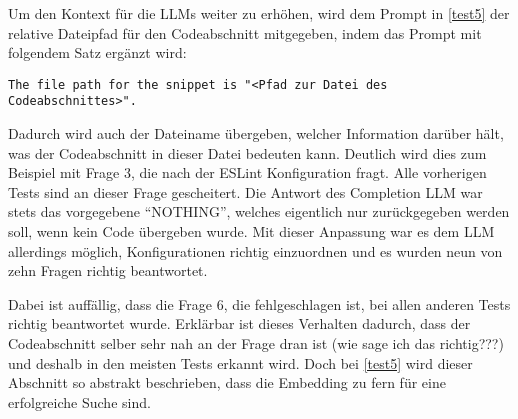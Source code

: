 \documentclass[../main.tex]{subfiles}
\begin{document}
Um den Kontext für die \glspl{LLM} weiter zu erhöhen, wird dem Prompt in \ref{test5} der relative Dateipfad für den Codeabschnitt mitgegeben, indem das Prompt mit folgendem Satz ergänzt wird:
\begin{center}
\begin{lstlisting}
The file path for the snippet is "<Pfad zur Datei des Codeabschnittes>".
\end{lstlisting}
\end{center}
Dadurch wird auch der Dateiname übergeben, welcher Information darüber hält, was der Codeabschnitt in dieser Datei bedeuten kann.
Deutlich wird dies zum Beispiel mit Frage 3, die nach der ESLint Konfiguration fragt.
Alle vorherigen Tests sind an dieser Frage gescheitert.
Die Antwort des Completion \gls{LLM} war stets das vorgegebene \enquote{NOTHING}, welches eigentlich nur zurückgegeben werden soll, wenn kein Code übergeben wurde.
Mit dieser Anpassung war es dem \gls{LLM} allerdings möglich, Konfigurationen richtig einzuordnen und es wurden neun von zehn Fragen richtig beantwortet.

Dabei ist auffällig, dass die Frage 6, die fehlgeschlagen ist, bei allen anderen Tests richtig beantwortet wurde.
Erklärbar ist dieses Verhalten dadurch, dass der Codeabschnitt selber sehr nah an der Frage dran ist (wie sage ich das richtig???) und deshalb in den meisten Tests erkannt wird.
Doch bei \ref{test5} wird dieser Abschnitt so abstrakt beschrieben, dass die Embedding zu fern für eine erfolgreiche Suche sind.
\end{document}
